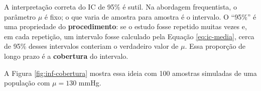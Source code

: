 \documentclass[
]{book}
\newenvironment{Shaded}{\begin{snugshade}}{\end{snugshade}}
\newcommand{\AttributeTok}[1]{\textcolor[rgb]{0.13,0.29,0.53}{#1}}
\newcommand{\ConstantTok}[1]{\textcolor[rgb]{0.56,0.35,0.01}{#1}}
\newcommand{\DecValTok}[1]{\textcolor[rgb]{0.00,0.00,0.81}{#1}}
\newcommand{\FunctionTok}[1]{\textcolor[rgb]{0.13,0.29,0.53}{\textbf{#1}}}
\newcommand{\NormalTok}[1]{#1}
\newcommand{\OtherTok}[1]{\textcolor[rgb]{0.56,0.35,0.01}{#1}}
\newcommand{\SpecialCharTok}[1]{\textcolor[rgb]{0.81,0.36,0.00}{\textbf{#1}}}
\newcommand{\StringTok}[1]{\textcolor[rgb]{0.31,0.60,0.02}{#1}}
\begin{document}
A interpretação correta do IC de 95\% é sutil. Na abordagem frequentista, o parâmetro \(\mu\) é fixo; o que varia de amostra para amostra é o intervalo. O ``95\%'' é uma propriedade do \textbf{procedimento}: se o estudo fosse repetido muitas vezes e, em cada repetição, um intervalo fosse calculado pela Equação \eqref{eq:ic-media}, cerca de 95\% desses intervalos conteriam o verdadeiro valor de \(\mu\). Essa proporção de longo prazo é a \textbf{cobertura} do intervalo.

A Figura \ref{fig:inf-cobertura} mostra essa ideia com 100 amostras simuladas de uma população com \(\mu = 130\) mmHg.

\begin{Shaded}
\end{Shaded}
\end{document}
